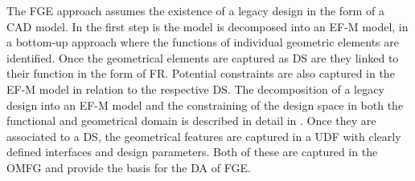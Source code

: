 \documentclass[aerospace,article,submit,moreauthors,pdftex]{Definitions/mdpi}
\begin{document}
{%
The FGE approach assumes the existence of a legacy design in the form of a CAD model.
In the first step is the model is decomposed into an EF-M model, in a bottom-up approach where the functions of individual geometric elements are identified.
Once the geometrical elements are captured as DS are they linked to their function in the form of FR.
Potential constraints are also captured in the EF-M model in relation to the respective DS.
The decomposition of a legacy design into an EF-M model and the constraining of the design space in both the functional and geometrical domain is described in detail in \cite{Muller2020MappingManufacturing}.
Once they are associated to a DS, the geometrical features are captured in a \ac{UDF} with clearly defined interfaces and design parameters.
Both of these are captured in the \ac{OMFG} and provide the basis for the \ac{DA} of FGE.}
\end{document}
